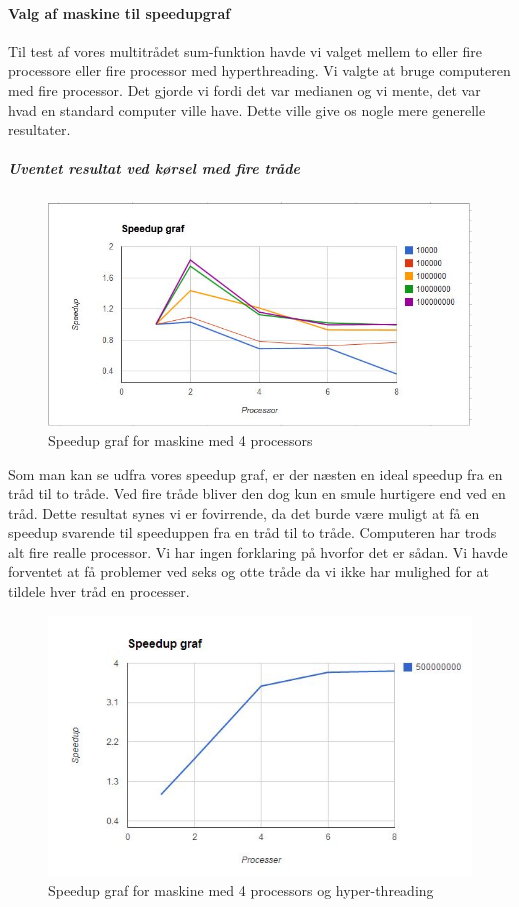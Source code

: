\paragraph{Valg af maskine til speedupgraf}
Til test af vores multitrådet sum-funktion havde vi valget mellem to eller fire processore eller fire processor med hyperthreading. Vi valgte at bruge computeren med fire processor. Det gjorde vi fordi det var medianen og vi mente,  det var hvad en standard computer ville have. Dette ville give os nogle mere generelle resultater. 

\subparagraph{Uventet resultat ved kørsel med fire tråde}

\begin{figure}[h!]
\centering
\includegraphics{Images/oo2-1-2-FrederikSpeedUp}
\caption{Speedup graf for maskine med 4 processors}
\label{FrederikSpeed}
\end{figure}

Som man kan se udfra vores speedup graf, er der næsten en ideal speedup fra en tråd til to tråde. Ved fire tråde bliver den dog kun en smule hurtigere end ved en tråd. Dette resultat synes vi er fovirrende, da det burde være muligt at få en speedup svarende til speeduppen fra en tråd til to tråde. Computeren har trods alt fire realle processor. Vi har ingen forklaring på hvorfor det er sådan. 
Vi havde forventet at få problemer ved seks og otte tråde da vi ikke har mulighed for at tildele hver tråd en processer. 

\begin{figure}[h!]
\centering
\includegraphics{Images/oo2-1-2-MelnykSpeedUp}
\caption{Speedup graf for maskine med 4 processors og hyper-threading}
\label{MelnykSpeed}
\end{figure}

